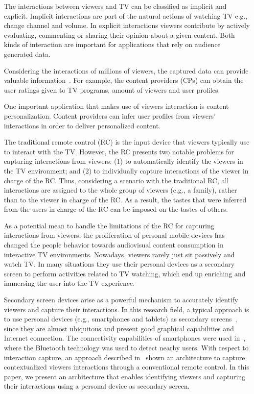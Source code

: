 \documentclass[conference,a4paper]{IEEEtran}
\begin{document}
The interactions between viewers and TV can be classified as implicit and explicit. Implicit interactions are part of the natural actions of watching TV e.g., change channel and volume. In explicit interactions viewers contribute by actively evaluating, commenting or sharing their opinion about a given content. Both kinds of interaction are important for applications that rely on audience generated data.

Considering the interactions of millions of viewers, the captured data can provide valuable information~\cite{Teixeira2010}. For example, the content providers (CPs) can obtain the user ratings given to TV programs, amount of viewers and user profiles. 

One important application that makes use of viewers interaction is content personalization. Content providers can infer user profiles from viewers' interactions in order to deliver personalized content.

The traditional remote control (RC) is the input device that viewers typically use to interact with the TV. However, the RC presents two notable problems for capturing interactions from viewers: (1) to automatically identify the viewers in the TV environment; and (2) to individually capture interactions of the viewer in charge of the RC. Thus, considering a scenario with the traditional RC, all interactions are assigned to the whole group of viewers (e.g., a family), rather than to the viewer in charge of the RC. As a result, the tastes that were inferred from the users in charge of the RC can be imposed on the tastes of others.

As a potential mean to handle the limitations of the RC for capturing interactions from viewers, the proliferation of personal mobile devices has changed the people behavior towards audiovisual content consumption in interactive TV environments. Nowadays, viewers rarely just sit passively and watch TV. In many situations they use their personal devices as a secondary screen to perform activities related to TV watching, which end up enriching and immersing the user into the TV experience. 

Secondary screen devices arise as a powerful mechanism to accurately identify viewers and  capture their interactions. In this research field, a typical approach is to use personal devices (e.g., smartphones and tablets) as secondary screens~\cite{Courtois2012}, since they are almost ubiquitous and present good graphical capabilities and Internet connection. The connectivity capabilities of smartphones were used in~\cite{Cabarcos2011}, where the Bluetooth technology was used to detect nearby users. With respect to interaction capture, an approach described in~\cite{Teixeira2010} shown an architecture to capture contextualized viewers interactions through a conventional remote control. In this paper, we present an architecture that enables identifying viewers and capturing their interactions using a personal device as secondary screen. 
\end{document}
